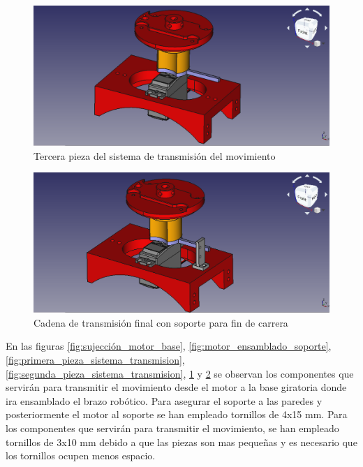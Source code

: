 \begin{figure}[H]
    \centering 
    \includegraphics[width=1\linewidth]{pictures/MotorMasTerceraPieza.png}
    \caption{Tercera pieza del sistema de transmisión del movimiento}
    \label{fig:tercera_pieza_sistema_transmision}
\end{figure}

\begin{figure}[H]
    \centering 
    \includegraphics[width=1\linewidth]{pictures/FinalDeCarrera.png}
    \caption{Cadena de transmisión final con soporte para fin de carrera}
    \label{fig:sistema_transmision_fin_carrera}
\end{figure}

En las figuras \ref{fig:sujección_motor_base}, \ref{fig:motor_ensamblado_soporte}, \ref{fig:primera_pieza_sistema_transmision},
\ref{fig:segunda_pieza_sistema_transmision},
\ref{fig:tercera_pieza_sistema_transmision} y \ref{fig:sistema_transmision_fin_carrera} se observan los componentes que servirán para transmitir el movimiento desde el motor a la base giratoria donde ira ensamblado el brazo robótico. Para asegurar el soporte a las paredes y posteriormente el motor al soporte se han empleado tornillos de 4x15 mm. Para los componentes que servirán para transmitir el movimiento, se han empleado tornillos de 3x10 mm debido a que las piezas son mas pequeñas y es necesario que los tornillos ocupen menos espacio.

